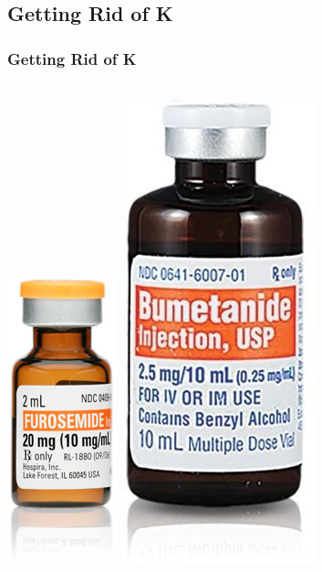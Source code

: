 \documentclass{beamer}
\begin{document}
\subsection{Getting Rid of K}
\begin{frame}
	\frametitle{Getting Rid of K}
	\pause
			\begin{columns}
				\centering
				\includegraphics[height=.4\textheight,keepaspectratio]{media/lasix.png}
				\centering
				\includegraphics[height=.4\textheight,keepaspectratio]{media/bumex.jpeg}

\end{columns}
\end{frame}
\end{document}
